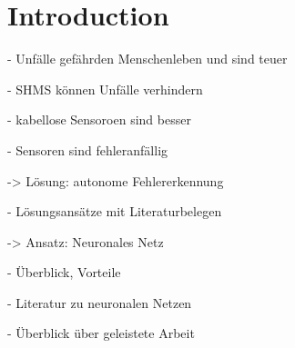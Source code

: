 \documentclass[12pt]{article}
\newenvironment{sciabstract}{%
\begin{quote} \bf}
{\end{quote}}
\begin{document}
\begin{sciabstract}




\end{sciabstract}

\section*{Introduction}

- Unfälle gefährden Menschenleben und sind teuer

- SHMS können Unfälle verhindern

- kabellose Sensoroen sind besser

- Sensoren sind fehleranfällig

-> Lösung: autonome Fehlererkennung 

- Lösungsansätze mit Literaturbelegen

-> Ansatz: Neuronales Netz

- Überblick, Vorteile

- Literatur zu neuronalen Netzen

- Überblick über geleistete Arbeit


\newpage
\end{document}
